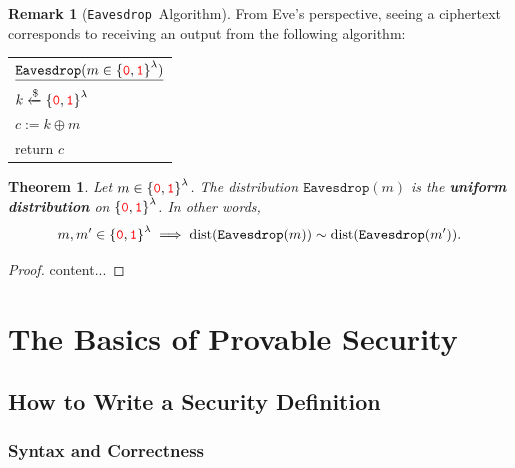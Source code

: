 \documentclass[12pt,openany]{book}
\newtheorem{theorem}{Theorem}[chapter]
\theoremstyle{definition}
\newtheorem{remark}{Remark}[chapter]
\newcommand{\zero}{\textcolor{red}{\texttt{0}}}
\newcommand{\one}{\textcolor{red}{\texttt{1}}}
\newcommand{\tab}{\hspace{12pt}}
\newcommand{\xor}{\oplus}
\newcommand{\randomness}{\$}
\newcommand{\uniform}{\xleftarrow{\randomness}}
\newcommand{\binaryfield}{\set{\zero,\one}}
\newcommand{\eavesdrop}{\texttt{Eavesdrop}}
\begin{document}
	\newpage
	\begin{remark}[\eavesdrop\ Algorithm]
		From Eve’s perspective, seeing a ciphertext corresponds to receiving
		an output from the following algorithm: \\ \begin{center}
		\begin{tabular}{|l|}
			\hline
			\(\underline{\eavesdrop(m\in\binaryfield^\lambda)}\)\\
			\tab\(k\uniform\binaryfield^\lambda\)\\
			\tab\(c:=k\xor m\)\\
			\tab return \(c\)\\
			\hline
		\end{tabular}
		\end{center}
	\end{remark}

	\begin{tcolorbox}[colback=white,colframe=thmcolor,arc=5pt,title={\color{white}\bf }]
		\begin{theorem}
			Let \(m\in\binaryfield^\lambda\). The distribution \(\eavesdrop(m)\) is the \textbf{uniform distribution} on \(\binaryfield^\lambda\). In other words, \[
			m,m'\in\binaryfield^\lambda\implies\textnormal{dist}(\eavesdrop(m))\sim\textnormal{dist}(\eavesdrop(m')).
			\]
		\end{theorem}
	\end{tcolorbox}
	\begin{proof}
		content...
	\end{proof}
	
	\chapter{The Basics of Provable Security}
	
	\section{How to Write a Security Definition}
	\subsection{Syntax and Correctness}
	
\end{document}
